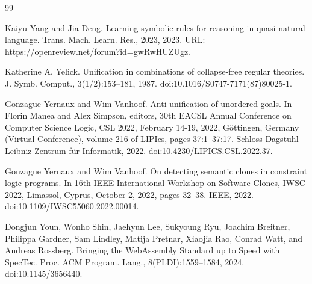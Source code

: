 \documentclass[10pt,a4paper]{amsart}
\begin{document}
\begin{thebibliography}{99}
\par\noindent  [45]  Kaiyu Yang and Jia Deng.  Learning symbolic rules for reasoning in quasi-natural language.  Trans. Mach. Learn. Res., 2023, 2023.  URL: https://openreview.net/forum?id=gwRwHUZUgz.  
 
\par\noindent  [46]  Katherine A. Yelick.  Unification in combinations of collapse-free regular theories.  J. Symb. Comput., 3(1/2):153–181, 1987.  doi:10.1016/S0747-7171(87)80025-1.  
 
\par\noindent  [47]  Gonzague Yernaux and Wim Vanhoof.  Anti-unification of unordered goals.  In Florin Manea and Alex Simpson, editors, 30th EACSL Annual Conference on Computer Science Logic, CSL 2022, February 14-19, 2022, Göttingen, Germany (Virtual Conference), volume 216 of LIPIcs, pages 37:1–37:17. Schloss Dagstuhl – Leibniz-Zentrum für Informatik, 2022.  doi:10.4230/LIPICS.CSL.2022.37.  
 
\par\noindent  [48]  Gonzague Yernaux and Wim Vanhoof.  On detecting semantic clones in constraint logic programs.  In 16th IEEE International Workshop on Software Clones, IWSC 2022, Limassol, Cyprus, October 2, 2022, pages 32–38. IEEE, 2022.  doi:10.1109/IWSC55060.2022.00014.  
 
\par\noindent  [49]  Dongjun Youn, Wonho Shin, Jaehyun Lee, Sukyoung Ryu, Joachim Breitner, Philippa Gardner, Sam Lindley, Matija Pretnar, Xiaojia Rao, Conrad Watt, and Andreas Rossberg.  Bringing the WebAssembly Standard up to Speed with SpecTec.  Proc. ACM Program. Lang., 8(PLDI):1559–1584, 2024.  doi:10.1145/3656440.  
  
\end{thebibliography}
\end{document}
